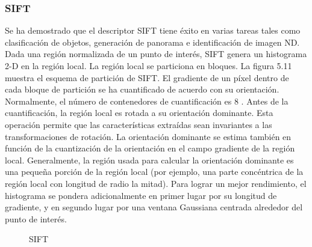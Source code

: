 \subsubsection{SIFT}
Se ha demostrado que el descriptor SIFT tiene éxito en varias tareas tales como clasificación de objetos, generación de panorama e identificación de imagen ND. Dada una región normalizada de un punto de interés, SIFT genera un histograma 2-D en la región local. La región local se particiona en bloques. La figura 5.11 muestra el esquema de partición de SIFT. El gradiente de un píxel dentro de cada bloque de partición se ha cuantificado de acuerdo con su orientación. Normalmente, el número de contenedores de cuantificación es 8 \cite{Reference28}. Antes de la cuantificación, la región local es rotada a su orientación dominante. Esta operación permite que las características extraídas sean invariantes a las transformaciones de rotación. La orientación dominante se estima también en función de la cuantización de la orientación en el campo gradiente de la región local. Generalmente, la región usada para calcular la orientación dominante es una pequeña porción de la región local (por ejemplo, una parte concéntrica de la región local con longitud de radio la mitad). Para lograr un mejor rendimiento, el histograma se pondera adicionalmente en primer lugar	 por su longitud de gradiente, y en segundo lugar por una ventana Gaussiana centrada alrededor del punto de interés. \\

\begin{figure}[htbp]
\centering
{}
\caption{SIFT} \label{fig:señales}
\end{figure}

